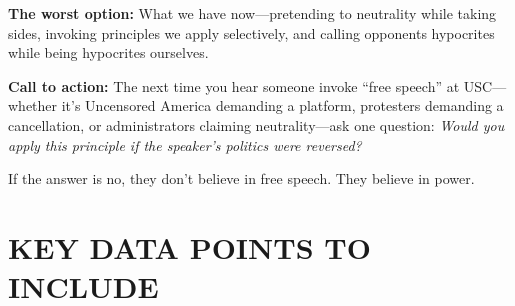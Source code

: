 \documentclass[11pt,letterpaper]{article}
\begin{document}
\textbf{The worst option:} What we have now---pretending to neutrality while taking sides, invoking principles we apply selectively, and calling opponents hypocrites while being hypocrites ourselves.

\textbf{Call to action:} The next time you hear someone invoke ``free speech'' at USC---whether it's Uncensored America demanding a platform, protesters demanding a cancellation, or administrators claiming neutrality---ask one question: \textit{Would you apply this principle if the speaker's politics were reversed?}

If the answer is no, they don't believe in free speech. They believe in power.

\section{KEY DATA POINTS TO INCLUDE}
\end{document}
